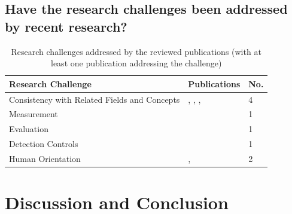 \documentclass[runningheads]{llncs}
\begin{document}
\subsection{Have the research challenges been addressed by recent research?}\label{Q2}
\begin{table}
    \centering
    \caption{Research challenges addressed by the reviewed publications (with at least one publication addressing the challenge)}
    \label{challenges_table}
    \begin{tabular}{ | l | l | l | }
        \hline
        \textbf{Research Challenge}                  & \textbf{Publications}                                                                         & \textbf{No. } \\
        \hline
        \hline
        Consistency with Related Fields and Concepts & \cite{Zaman20192982}, \cite{Accorsi20131462}, \cite{Zahoransky2014360}, \cite{Dedousis202235} & 4                            \\
        \hline
        Measurement                                  & \cite{Dedousis202235}                                                                         & 1                            \\
        \hline
        Evaluation                                   & \cite{Zahoransky2014360}                                                                      & 1                            \\

        \hline
        Detection Controls                           & \cite{Mishra2018613}                                                                          & 1                            \\
        \hline
        Human Orientation                            & \cite{Mardani2013}, \cite{Zhu201783}                                                          & 2                            \\
        \hline
    \end{tabular}
\end{table}

\section{Discussion and Conclusion}\label{Conclusion}

%
%
% 
% 
%

{}
\end{document}
